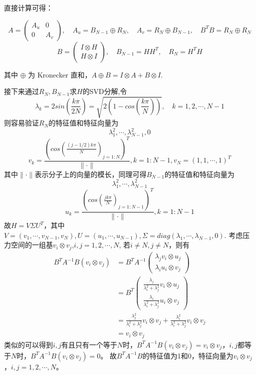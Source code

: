 \documentclass{article}
\begin{document}
直接计算可得：

\[
A = \begin{pmatrix}
A_u & 0 \\
0 & A_v
\end{pmatrix}, \quad
A_u = B_{N-1} \oplus R_N, \quad
A_v = R_N \oplus B_{N-1}, \quad
B^T B = R_N \oplus R_N
\]
\[B = \begin{pmatrix}
  I \otimes H \\
  H \otimes I
\end{pmatrix}, \quad
B_{N-1} = H H^T, \quad
R_N = H^T H
\]

其中 $\oplus$ 为 Kronecker 直和，$A \oplus B = I \otimes A + B \otimes I$.

接下来通过$R_N,B_{N-1}$求$H$的SVD分解,令
\[
  \lambda_k = 2sin(\frac{k\pi}{2N}) = \sqrt{2(1-cos(\frac{k\pi}{N}))}, \quad k = 1,2,\cdots,N-1
\]
则容易验证$R_N$的特征值和特征向量为
\[
  \lambda_1^2, \cdots, \lambda_{N-1}^2, 0 
\]
\[
  v_k = \frac{(cos(\frac{(j-1/2)k\pi}{N})_{j=1:N})^T}{\|\cdot\|} ,k = 1:N-1, v_N = (1,1,\cdots,1)^T
\]
其中$\|\cdot\|$表示分子上的向量的模长，同理可得$B_{N-1}$的特征值和特征向量为
\[
  \lambda_1^2, \cdots, \lambda_{N-1}^2
\]
\[
  u_k = \frac{(cos(\frac{jk\pi}{N})_{j=1:N-1})^T}{\|\cdot\|} ,k = 1:N-1
\]
故$H = V \Sigma U^T$，其中$V = (v_1, \cdots, v_{N-1}, v_N), U = (u_1, \cdots, u_{N-1}), \Sigma = diag(\lambda_1, \cdots, \lambda_{N-1}, 0)$.
考虑压力空间的一组基$v_i\otimes v_j$,$i,j = 1,2,\cdots,N$,
若$i\neq N , j\neq N$，则有
\begin{align}
  B^T A^{-1}B (v_i\otimes v_j) &=  B^T A^{-1}
  \begin{pmatrix}
    \lambda_j v_i\otimes u_j \\
    \lambda_i u_i\otimes v_j
  \end{pmatrix}  \\
  & = B^T
  \begin{pmatrix}
    \frac{\lambda_j}{\lambda_i^2+\lambda_j^2} v_i \otimes u_j \\
    \frac{\lambda_i}{\lambda_i^2+\lambda_j^2} u_i \otimes v_j
  \end{pmatrix} \\
  & = \frac{\lambda_j^2}{\lambda_i^2+\lambda_j^2} v_i \otimes v_j + \frac{\lambda_i^2}{\lambda_i^2+\lambda_j^2} v_i \otimes v_j \\
  & = v_i \otimes v_j
\end{align}
类似的可以得到$i,j$有且只有一个等于$N$时，$B^T A^{-1}B (v_i\otimes v_j) = v_i \otimes v_j$，$i,j$都等于$N$时，$B^T A^{-1}B (v_i\otimes v_j) = 0$。
故$B^T A^{-1}B$的特征值为1和0，特征向量为$v_i\otimes v_j$，$i,j = 1,2,\cdots,N$。
\end{document}
